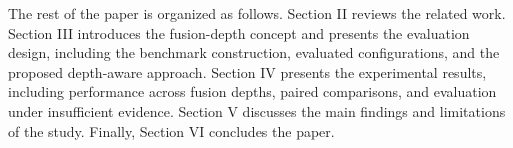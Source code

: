 \documentclass[conference]{IEEEtran}
\begin{document}
The rest of the paper is organized as follows. Section II reviews the related work. Section III introduces the fusion-depth concept and presents the evaluation design, including the benchmark construction, evaluated configurations, and the proposed depth-aware approach. Section IV presents the experimental results, including performance across fusion depths, paired comparisons, and evaluation under insufficient evidence. Section V discusses the main findings and limitations of the study. Finally, Section VI concludes the paper.

\end{document}
